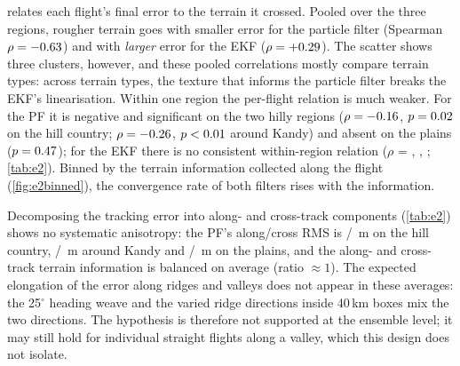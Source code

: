 relates each flight's final error to the terrain it crossed. Pooled over the
three regions, rougher terrain goes with smaller error for the particle filter (Spearman
$\rho = -0.63$) and with \emph{larger} error for the EKF
($\rho = +0.29$). The scatter shows three clusters, however, and these pooled correlations
mostly compare terrain types: across terrain types, the texture that informs the particle filter
breaks the EKF's linearisation. Within one region the per-flight relation is much weaker. For the
PF it is negative and significant on the two hilly regions ($\rho = -0.16$,
$p = 0.02$ on the hill country; $\rho = -0.26$,
$p <0.01$ around Kandy) and absent on the plains
($p = 0.47$); for the EKF there is no consistent within-region relation
($\rho$ = \ETwoHillEkfRho, \ETwoKandyEkfRho, \ETwoPlainsEkfRho; \cref{tab:e2}). Binned by the terrain
information collected along the flight (\cref{fig:e2binned}), the convergence rate of both filters
rises with the information.


Decomposing the tracking error into along- and cross-track components (\cref{tab:e2}) shows no
systematic anisotropy: the PF's along/cross RMS is \ETwoHillPfFiveZeroZeroZeroAlong{}/%
\ETwoHillPfFiveZeroZeroZeroCross\,m on the hill country, \ETwoKandyPfFiveZeroZeroZeroAlong/%
\ETwoKandyPfFiveZeroZeroZeroCross\,m around Kandy and \ETwoPlainsPfFiveZeroZeroZeroAlong/%
\ETwoPlainsPfFiveZeroZeroZeroCross\,m on the plains, and the along- and cross-track terrain
information is balanced on average (ratio $\approx 1$). The expected elongation of the error along
ridges and valleys does not appear in these averages: the 25$^\circ$ heading weave and the varied
ridge directions inside 40\,km boxes mix the two directions. The hypothesis is therefore not
supported at the ensemble level; it may still hold for individual straight flights along a valley,
which this design does not isolate.

\begin{table}[t]
  \centering\small
  \caption{E2 per region ($\sigma_0 = 500$\,m, $M = \ETwoRuns$): convergence, median roughness
    under the flights, tracking RMS along and across the track (converged runs), median ratio of
    along- to cross-track terrain information, and the within-region Spearman correlation between
    roughness and final error.}\label{tab:e2}
  
\end{table}

